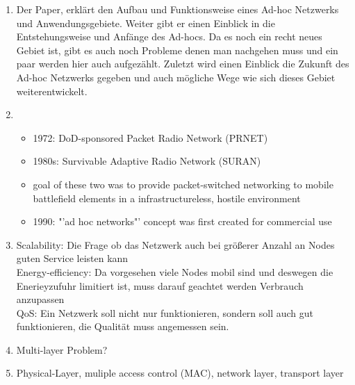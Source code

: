    \begin{enumerate}[label=\arabic*)]
        \item Der Paper, erklärt den Aufbau und Funktionsweise eines Ad-hoc Netzwerks und Anwendungsgebiete. Weiter gibt er einen Einblick in die Entstehungsweise und Anfänge des Ad-hocs. Da es noch ein recht neues Gebiet ist, gibt es auch noch Probleme denen man nachgehen muss und ein paar werden hier auch aufgezählt. Zuletzt wird einen Einblick die Zukunft des Ad-hoc Netzwerks gegeben und auch mögliche Wege wie sich dieses Gebiet weiterentwickelt.
        \item \begin{itemize}
        \item 1972: DoD-sponsored Packet Radio Network (PRNET)
        \item 1980s: Survivable Adaptive Radio Network (SURAN)
        \item goal of these two was to provide packet-switched networking to mobile battlefield elements in a infrastructureless, hostile environment
        \item 1990: "'ad hoc networks"' concept was first created for commercial use
        \end{itemize}
        \item Scalability: Die Frage ob das Netzwerk auch bei größerer Anzahl an Nodes guten Service leisten kann\\
    Energy-efficiency: Da vorgesehen viele Nodes mobil sind und deswegen die Enerieyzufuhr limitiert ist, muss darauf geachtet werden Verbrauch anzupassen\\
    QoS: Ein Netzwerk soll nicht nur funktionieren, sondern soll auch gut funktionieren, die Qualität muss angemessen sein.
    \item Multi-layer Problem?
    \item Physical-Layer, muliple access control (MAC), network layer, transport layer
        \end{enumerate}



